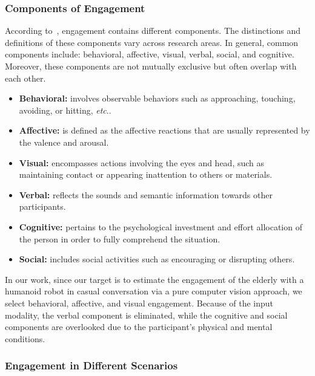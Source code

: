 \documentclass[10pt,journal,compsoc]{IEEEtran}
\makeatletter
\DeclareRobustCommand\onedot{\futurelet\@let@token\@onedot}
\def\@onedot{\ifx\@let@token.\else.\null\fi\xspace}
\def\etc{\emph{etc}\onedot} \def\vs{\emph{vs}\onedot}
\makeatother
\begin{document}
\subsubsection{Components of Engagement}

According to~\cite{Castellano2009Detecting, Guhan2020ABCNet, Sumer2021Multimodal, Christenson2012Handbook, OBrien2008What, CohenMansfield2011Comprehensive, Archambault2017Joint, BenEliyahu2018Investigating, Corrigan2016Engagement, Perugia2020ENGAGEDEM}, engagement contains different components. The distinctions and definitions of these components vary across research areas. In general, common components include: behavioral, affective, visual, verbal, social, and cognitive. Moreover, these components are not mutually exclusive but often overlap with each other.

\begin{itemize}
  \item \textbf{Behavioral:} involves observable behaviors such as approaching, touching, avoiding, or hitting, \etc
  \item \textbf{Affective:} is defined as the affective reactions that are usually represented by the valence and arousal.
  \item \textbf{Visual:} encompasses actions involving the eyes and head, such as maintaining contact or appearing inattention to others or materials.
  \item \textbf{Verbal:} reflects the sounds and semantic information towards other participants.
  \item \textbf{Cognitive:} pertains to the psychological investment and effort allocation of the person in order to fully comprehend the situation.
  \item \textbf{Social:} includes social activities such as encouraging or disrupting others.
\end{itemize}

In our work, since our target is to estimate the engagement of the elderly with a humanoid robot in casual conversation via a pure computer vision approach, we select behavioral, affective, and visual engagement. Because of the input modality, the verbal component is eliminated, while the cognitive and social components are overlooked due to the participant's physical and mental conditions.

\subsubsection{Engagement in Different Scenarios}
\end{document}
